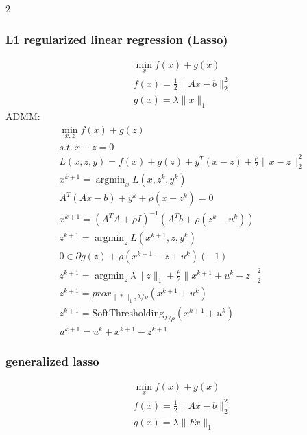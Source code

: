 \documentclass[8pt]{extarticle}
\DeclareMathOperator*{\argmin}{argmin}
\newcommand{\norm}[1]{\|#1\|}
\begin{document}
\begin{multicols*}{2}
  \subsubsection{L1 regularized linear regression (Lasso)}
  \begin{align*}
    &\min_x f(x) + g(x)\\
    &f(x) = \frac{1}{2}\norm{Ax-b}_2^2\\
    &g(x)=\lambda\norm{x}_1
  \end{align*}
  ADMM:
  \begin{align*}
    &\min_{x,z} f(x) + g(z)\\
    &s.t.\ x-z=0\\
    &L(x,z,y)=f(x) + g(z) + y^T(x-z) + \frac{\rho}{2}\norm{x-z}_2^2\\
    &x^{k+1} = \argmin_x L(x,z^k,y^k)\\
    &A^T(Ax-b) + y^k + \rho (x-z^k)=0\\
    &x^{k+1} = (A^TA+\rho I)^{-1}(A^Tb + \rho (z^k-u^k))\\
    &z^{k+1} = \argmin_z L(x^{k+1},z,y^k)\\
    &0 \in \partial g(z) +\rho(x^{k+1}-z+u^k)(-1)\\
    &z^{k+1} = \argmin_z \lambda\norm{z}_1 + \frac{\rho}{2}\norm{x^{k+1}+u^k-z}_2^2\\
    &z^{k+1} = prox_{\norm{*}_1, \lambda/\rho}(x^{k+1}+u^k)\\
    &z^{k+1} = \text{SoftThresholding}_{\lambda/\rho}(x^{k+1}+u^k)\\
    &u^{k+1} = u^k+x^{k+1}-z^{k+1}
  \end{align*}  

  \vfill\null
  \columnbreak
  
  \subsubsection{generalized lasso}
  \begin{align*}
    &\min_x f(x) + g(x)\\
    &f(x) = \frac{1}{2}\norm{Ax-b}_2^2\\
    &g(x)=\lambda\norm{Fx}_1
  \end{align*}
  

\end{multicols*}
\end{document}
